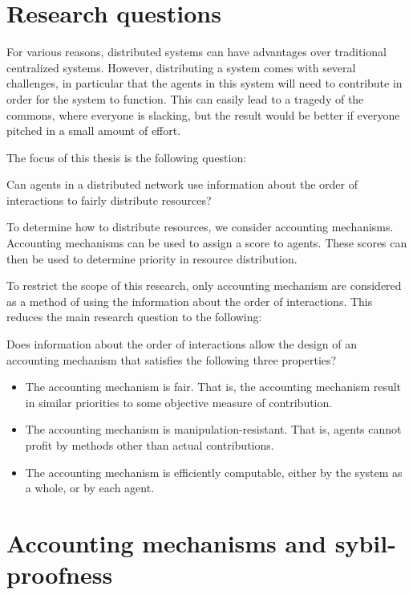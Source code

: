 \documentclass[a4paper,11pt]{book}
\theoremstyle{definition}
\begin{document}
\chapter{Research questions}

For various reasons, distributed systems can have advantages over traditional centralized
systems. However, distributing a system comes with several challenges, in particular that
the agents in this system will need to contribute in order for the system to
function. This can easily lead to a tragedy of the commons, where everyone is slacking,
but the result would be better if everyone pitched in a small amount of effort.

The focus of this thesis is the following question:

\begin{center}
    Can agents in a distributed network use information about the order of
    interactions to fairly distribute resources?
\end{center}

To determine how to distribute resources, we consider accounting mechanisms. Accounting
mechanisms can be used to assign a score to agents. These scores can then
be used to determine priority in resource distribution.

To restrict the scope of this research, only accounting mechanism are considered as a method
of using the information about the order of interactions. This reduces the main research question
to the following:

Does information about the order of interactions allow the design of an accounting mechanism
that satisfies the following three properties?

\begin{itemize}
    \item The accounting mechanism is fair. That is, the accounting mechanism result in
        similar priorities to some objective measure of contribution.
    \item The accounting mechanism is manipulation-resistant. That is, agents 
        cannot profit by methods other than actual contributions.
    \item The accounting mechanism is efficiently computable, either by the system as a whole,
        or by each agent.
\end{itemize}




\chapter{Accounting mechanisms and sybil-proofness}
\end{document}
